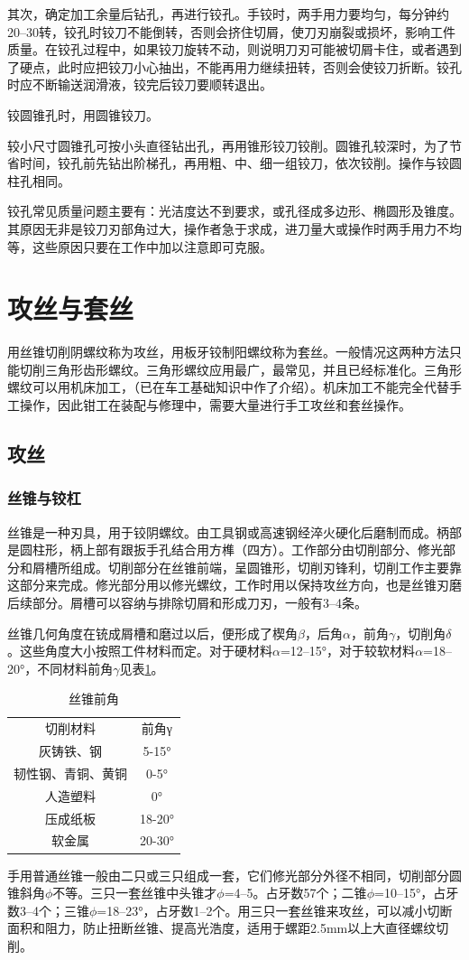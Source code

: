 \documentclass{ctexbook}
\begin{document}
其次，确定加工余量后钻孔，再进行铰孔。手铰时，两手用力要均匀，每分钟约20--30转，铰孔时铰刀不能倒转，否则会挤住切屑，使刀刃崩裂或损坏，影响工件质量。在铰孔过程中，如果铰刀旋转不动，则说明刀刃可能被切屑卡住，或者遇到了硬点，此时应把铰刀小心抽出，不能再用力继续扭转，否则会使铰刀折断。铰孔时应不断输送润滑液，铰完后铰刀要顺转退出。

铰圆锥孔时，用圆锥铰刀。

较小尺寸圆锥孔可按小头直径钻出孔，再用锥形铰刀铰削。圆锥孔较深时，为了节省时间，铰孔前先钻出阶梯孔，再用粗、中、细一组铰刀，依次铰削。操作与铰圆柱孔相同。

铰孔常见质量问题主要有：光洁度达不到要求，或孔径成多边形、椭圆形及锥度。其原因无非是铰刀刃部角过大，操作者急于求成，进刀量大或操作时两手用力不均等，这些原因只要在工作中加以注意即可克服。
\section{攻丝与套丝}
用丝锥切削阴螺纹称为攻丝，用板牙铰制阳螺纹称为套丝。一般情况这两种方法只能切削三角形齿形螺纹。三角形螺纹应用最广，最常见，并且已经标准化。三角形螺纹可以用机床加工，（已在车工基础知识中作了介绍）。机床加工不能完全代替手工操作，因此钳工在装配与修理中，需要大量进行手工攻丝和套丝操作。
\subsection{攻丝}
\subsubsection{丝锥与铰杠}
丝锥是一种刃具，用于铰阴螺纹。由工具钢或高速钢经淬火硬化后磨制而成。柄部是圆柱形，柄上部有跟扳手孔结合用方榫（四方）。工作部分由切削部分、修光部分和屑槽所组成。切削部分在丝锥前端，呈圆锥形，切削刃锋利，切削工作主要靠这部分来完成。修光部分用以修光螺纹，工作时用以保持攻丝方向，也是丝锥刃磨后续部分。屑槽可以容纳与排除切屑和形成刀刃，一般有3--4条。

丝锥几何角度在铳成屑槽和磨过以后，便形成了楔角$\beta$，后角$\alpha$，前角$\gamma$，切削角$\delta$。这些角度大小按照工件材料而定。对于硬材料$\alpha$=12--15°，对于较软材料$\alpha$=18--20°，不同材料前角$\gamma$见表\ref{tab:sizhuiqianjiao}。
\begin{table}[htbp]
	\centering
	\caption{丝锥前角}
	\begin{tabular}{cc}
		切削材料  & 前角γ \\
		灰铸铁、钢 & 5-15° \\
		韧性钢、青铜、黄铜 & 0-5° \\
		人造塑料  & 0° \\
		压成纸板  & 18-20° \\
		软金属   & 20-30° \\
	\end{tabular}%
	\label{tab:sizhuiqianjiao}%
\end{table}%
手用普通丝锥一般由二只或三只组成一套，它们修光部分外径不相同，切削部分圆锥斜角$\phi$不等。三只一套丝锥中头锥才$\phi$=4--5。占牙数57个；二锥$\phi$=10--15°，占牙数3--4个；三锥$\phi$=18--23°，占牙数1--2个。用三只一套丝锥来攻丝，可以减小切断面积和阻力，防止扭断丝锥、提高光浩度，适用于螺距2.5mm以上大直径螺纹切削。
\end{document}
